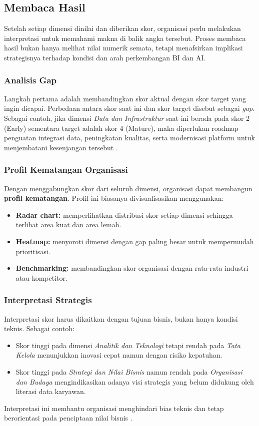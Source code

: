 \subsection{Membaca Hasil}

Setelah setiap dimensi dinilai dan diberikan skor, organisasi perlu melakukan interpretasi 
untuk memahami makna di balik angka tersebut. Proses membaca hasil bukan hanya melihat nilai 
numerik semata, tetapi menafsirkan implikasi strategisnya terhadap kondisi dan arah perkembangan BI dan AI.

\subsubsection*{Analisis Gap}
Langkah pertama adalah membandingkan skor aktual dengan skor target yang ingin dicapai. 
Perbedaan antara skor saat ini dan skor target disebut sebagai \textit{gap}.  
Sebagai contoh, jika dimensi \textit{Data dan Infrastruktur} saat ini berada pada skor 2 (Early) 
sementara target adalah skor 4 (Mature), maka diperlukan roadmap penguatan integrasi data, 
peningkatan kualitas, serta modernisasi platform untuk menjembatani kesenjangan tersebut \cite{tdwi2013, alsai2023}.

\subsubsection*{Profil Kematangan Organisasi}
Dengan menggabungkan skor dari seluruh dimensi, organisasi dapat membangun \textbf{profil kematangan}.  
Profil ini biasanya divisualisasikan menggunakan:
\begin{itemize}
	\item \textbf{Radar chart:} memperlihatkan distribusi skor setiap dimensi sehingga terlihat 
	area kuat dan area lemah.  
	\item \textbf{Heatmap:} menyoroti dimensi dengan gap paling besar untuk mempermudah prioritisasi.  
	\item \textbf{Benchmarking:} membandingkan skor organisasi dengan rata-rata industri atau kompetitor.  
\end{itemize}

\subsubsection*{Interpretasi Strategis}
Interpretasi skor harus dikaitkan dengan tujuan bisnis, bukan hanya kondisi teknis.  
Sebagai contoh:
\begin{itemize}
	\item Skor tinggi pada dimensi \textit{Analitik dan Teknologi} tetapi rendah pada 
	\textit{Tata Kelola} menunjukkan inovasi cepat namun dengan risiko kepatuhan.  
	\item Skor tinggi pada \textit{Strategi dan Nilai Bisnis} namun rendah pada 
	\textit{Organisasi dan Budaya} mengindikasikan adanya visi strategis 
	yang belum didukung oleh literasi data karyawan.  
\end{itemize}
Interpretasi ini membantu organisasi menghindari bias teknis dan tetap berorientasi 
pada penciptaan nilai bisnis \cite{ekambaram2021, labreuche2020}.

